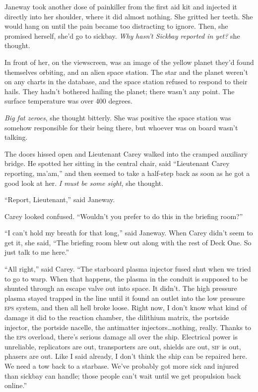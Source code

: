 \documentclass[twoside,letterpaper,12pt]{memoir}
\begin{document}
Janeway took another dose of painkiller from the first aid kit and injected it directly into her shoulder, where it did almost nothing. She gritted her teeth. She would hang on until the pain became too distracting to ignore. Then, she promised herself, she'd go to sickbay. \textit{Why hasn't Sickbay reported in yet?} she thought.

In front of her, on the viewscreen, was an image of the yellow planet they'd found themselves orbiting, and an alien space station. The star and the planet weren't on any charts in the database, and the space station refused to respond to their hails. They hadn't bothered hailing the planet; there wasn't any point. The surface temperature was over 400 degrees.

\textit{Big fat zeroes}, she thought bitterly. She was positive the space station was somehow responsible for their being there, but whoever was on board wasn't talking.

The doors hissed open and Lieutenant Carey walked into the cramped auxiliary bridge. He spotted her sitting in the central chair, said ``Lieutenant Carey reporting, ma'am,'' and then seemed to take a half-step back as soon as he got a good look at her. \textit{I must be some sight}, she thought.

``Report, Lieutenant,'' said Janeway.

Carey looked confused. ``Wouldn't you prefer to do this in the briefing room?''

``I can't hold my breath for that long,'' said Janeway. When Carey didn't seem to get it, she said, ``The briefing room blew out along with the rest of Deck One. So just talk to me here.''

``All right,'' said Carey. ``The starboard plasma injector fused shut when we tried to go to warp. When that happens, the plasma in the conduit is supposed to be shunted through an escape valve out into space. It didn't. The high pressure plasma stayed trapped in the line until it found an outlet into the low pressure \textsc{eps} system, and then all hell broke loose. Right now, I don't know what kind of damage it did to the reaction chamber, the dilithium matrix, the portside injector, the portside nacelle, the antimatter injectors\ldots nothing, really. Thanks to the \textsc{eps} overload, there's serious damage all over the ship. Electrical power is unreliable, replicators are out, transporters are out, shields are out, \textsc{sif} is out, phasers are out. Like I said already, I don't think the ship can be repaired here. We need a tow back to a starbase. We've probably got more sick and injured than sickbay can handle; those people can't wait until we get propulsion back online.''
\end{document}
